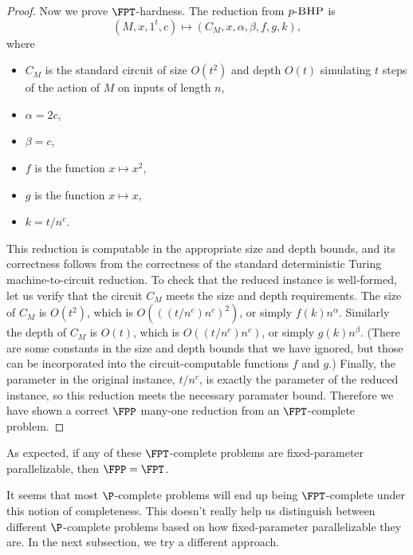 \documentclass{article}
\newcommand{\dash}{\textnormal{-}}
\newcommand{\pBHP}{p \dash \textsc{BHP}}
\newcommand{\pSCE}{p \dash \textsc{SCE}}
\begin{document}
\begin{proof}

  Now we prove $\FPT$-hardness.
  The reduction from $\pBHP$ is
  \[
  (M, x, 1^t, c) \mapsto (C_M, x, \alpha, \beta, f, g, k),
  \]
  where
  \begin{itemize}
  \item $C_M$ is the standard circuit of size $O(t^2)$ and depth $O(t)$ simulating $t$ steps of the action of $M$ on inputs of length $n$,
  \item $\alpha = 2c$,
  \item $\beta = c$,
  \item $f$ is the function $x \mapsto x^2$,
  \item $g$ is the function $x \mapsto x$,
  \item $k = t / n^c$.
  \end{itemize}
  This reduction is computable in the appropriate size and depth bounds, and its correctness follows from the correctness of the standard deterministic Turing machine-to-circuit reduction.
  To check that the reduced instance is well-formed, let us verify that the circuit $C_M$ meets the size and depth requirements.
  The size of $C_M$ is $O(t^2)$, which is $O(((t / n^c) n^c)^2)$, or simply $f(k) n^\alpha$.
  Similarly the depth of $C_M$ is $O(t)$, which is $O((t / n^c) n^c)$, or simply $g(k) n^\beta$.
  (There are some constants in the size and depth bounds that we have ignored, but those can be incorporated into the circuit-computable functions $f$ and $g$.)
  Finally, the parameter in the original instance, $t / n^c$, is exactly the parameter of the reduced instance, so this reduction meets the necessary paramater bound.
  Therefore we have shown a correct $\FPP$ many-one reduction from an $\FPT$-complete problem.
\end{proof}

As expected, if any of these $\FPT$-complete problems are fixed-parameter parallelizable, then $\FPP = \FPT$.

It seems that most $\P$-complete problems will end up being $\FPT$-complete under this notion of completeness.
This doesn't really help us distinguish between different $\P$-complete problems based on how fixed-parameter parallelizable they are.
In the next subsection, we try a different approach.
\end{document}

